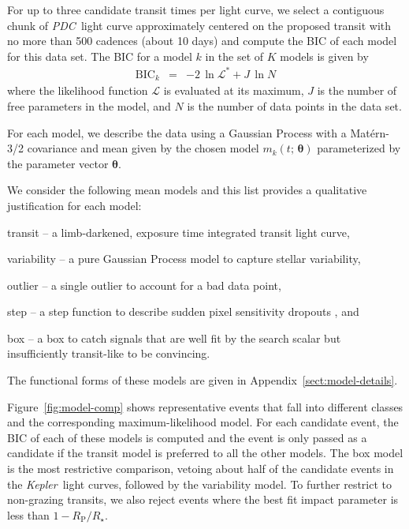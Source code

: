 \documentclass[manuscript, letterpaper]{aastex6}
\newcommand{\project}[1]{\textsl{#1}}
\newcommand{\kepler}{\project{Kepler}}
\newcommand{\pdc}{\project{PDC}}
\newcommand{\dfmfigref}[1]{\ref{fig:#1}}
\newcommand{\dfmFig}[1]{Figure~\dfmfigref{#1}}
\newcommand{\dfmfig}[1]{\dfmFig{#1}}
\newcommand{\sectref}[1]{\ref{sect:#1}}
\newcommand{\App}[1]{Appendix~\sectref{#1}}
\newcommand{\app}[1]{\App{#1}}
\newcommand{\bvec}[1]{{\ensuremath{\boldsymbol{#1}}}}
\newcommand{\meanpars}{{\ensuremath{\bvec{\theta}}}}
\newcommand{\modelname}[1]{{\textsf{#1}}}
\begin{document}
For up to three candidate transit times per light curve, we select a
contiguous chunk of \pdc\ light curve approximately centered on the proposed
transit with no more than 500 cadences (about 10 days) and compute the BIC of
each model for this data set.
The BIC for a model $k$ in the set of $K$ models is given by
\begin{eqnarray}
\mathrm{BIC}_k &=& -2\,\ln \mathcal{L}^* + J\,\ln N
\end{eqnarray}
where the likelihood function $\mathcal{L}$ is evaluated at its maximum, $J$
is the number of free parameters in the model, and $N$ is the number of
data points in the data set.

For each model, we describe the data using a Gaussian Process
\citep[GP;][]{Rasmussen:2006} with a Mat\'ern-3/2 covariance and mean given by
the chosen model $m_k(t;\,\meanpars)$ parameterized by the parameter vector
\meanpars.

We consider the following mean models and this list provides a qualitative
justification for each model:
\begin{itemize}
{\item \modelname{transit} -- a limb-darkened, exposure time integrated
transit light curve,}
{\item \modelname{variability} -- a pure Gaussian Process model to capture
stellar variability,}
{\item \modelname{outlier} -- a single outlier to account for a bad data
point,}
{\item \modelname{step} -- a step function to describe sudden pixel
sensitivity dropouts \citep[SPSDs; for example][]{Christiansen:2013}, and}
{\item \modelname{box} -- a box to catch signals that are well fit by the
search scalar but insufficiently transit-like to be convincing.}
\end{itemize}
The functional forms of these models are given in \app{model-details}.

\dfmfig{model-comp} shows representative events that fall into different
classes and the corresponding maximum-likelihood model.
For each candidate event, the BIC of each of these models is computed and the
event is only passed as a candidate if the \modelname{transit} model is
preferred to all the other models.
The \modelname{box} model is the most restrictive comparison, vetoing about
half of the candidate events in the \kepler\ light curves, followed by the
\modelname{variability} model.
To further restrict to non-grazing transits, we also reject events where the
best fit impact parameter is less than $1 - R_\mathrm{P} / R_\star$.
\end{document}

